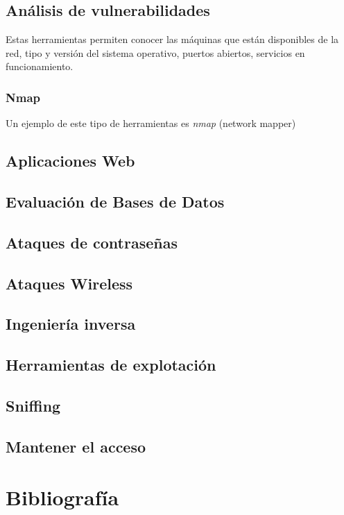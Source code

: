 \documentclass[a4paper, 11pt]{article}
\theoremstyle{plain}
\begin{document}
\subsection{Análisis de vulnerabilidades}

Estas herramientas permiten conocer las máquinas que están disponibles de la red, tipo y versión del sistema operativo, puertos abiertos, servicios en funcionamiento.

\subsubsection{Nmap}
Un ejemplo de este tipo de herramientas es \textit{nmap} (network mapper)


\subsection{Aplicaciones Web}
\subsection{Evaluación de Bases de Datos}
\subsection{Ataques de contraseñas}
\subsection{Ataques Wireless}
\subsection{Ingeniería inversa}
\subsection{Herramientas de explotación}
\subsection{Sniffing}
\subsection{Mantener el acceso}


\section{Bibliografía}
\end{document}
